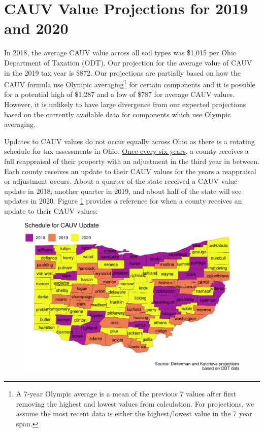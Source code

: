 \documentclass[]{article}
\let\rmarkdownfootnote\footnote%
\def\footnote{\protect\rmarkdownfootnote}
\begin{document}
\newpage
{}

\hypertarget{cauv-value-projections-for-2019-and-2020}{%
\section{CAUV Value Projections for 2019 and
2020}\label{cauv-value-projections-for-2019-and-2020}}

In 2018, the average CAUV value across all soil types was \$1,015 per
Ohio Department of Taxation (ODT). Our projection for the average value
of CAUV in the 2019 tax year is \$872. Our projections are partially
based on how the CAUV formula use Olympic averaging\footnote{A 7-year
  Olympic average is a mean of the previous 7 values after first
  removing the highest and lowest values from calculation. For
  projections, we assume the most recent data is either the
  highest/lowest value in the 7 year span.} for certain components and
it is possible for a potential high of \$1,287 and a low of \$787 for
average CAUV values. However, it is unlikely to have large divergence
from our expected projections based on the currently available data for
components which use Olympic averaging.

Updates to CAUV values do not occur equally across Ohio as there is a
rotating schedule for tax assessments in Ohio.
\href{https://www.tax.ohio.gov/real_estate/reappraisal_and_triennial_update.aspx}{Once
every six years}, a county receives a full reappraisal of their property
with an adjustment in the third year in between. Each county receives an
update to their CAUV values for the years a reappraisal or adjustment
occurs. About a quarter of the state received a CAUV value update in
2018, another quarter in 2019, and about half of the state will see
updates in 2020. Figure \ref{fig:update-map} provides a reference for
when a county receives an update to their CAUV values:

\begin{figure}[H]
\includegraphics[width=1\linewidth]{4-projections-2019-2020_files/figure-latex/update-map-1} \caption{\label{fig:update-map}}\label{fig:update-map}
\end{figure}
\end{document}
